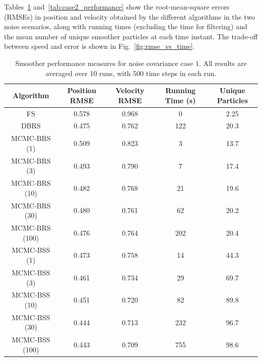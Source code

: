 \documentclass[10pt,twocolumn,twoside]{IEEEtran}
\begin{document}
Tables~\ref{tab:case1_performance} and~\ref{tab:case2_performance} show the root-mean-square errors (RMSEs) in position and velocity obtained by the different algorithms in the two noise scenarios, along with running times (excluding the time for filtering) and the mean number of unique smoother particles at each time instant. The trade-off between speed and error is shown in Fig.~\ref{fig:rmse_vs_time}.

\begin{table}[!t]%
\renewcommand{\arraystretch}{1.3}
\caption{Smoother performance measures for noise covariance case 1. All results are averaged over 10 runs, with 500 time steps in each run.}
\label{tab:case1_performance}
\centering
\begin{tabular}{|c||c|c|c|c|}
\hline
Algorithm & \begin{minipage}[c]{1cm} Position RMSE \end{minipage} & \begin{minipage}[c]{1cm}  Velocity RMSE \end{minipage} & \begin{minipage}[c]{1cm}  Running Time (s) \end{minipage} & \begin{minipage}[c]{1cm}  Unique Particles \end{minipage} \\
\hline
FS 						& 0.578 & 0.968 & 0 & 2.25 \\
DBRS					& 0.475 & 0.762 & 122 & 20.3 \\
\hline
MCMC-BRS (1)    & 0.509 & 0.823 & 3 & 13.7  \\
MCMC-BRS (3)    & 0.493 & 0.790 & 7 & 17.4  \\
MCMC-BRS (10)   & 0.482 & 0.768 & 21 & 19.6 \\
MCMC-BRS (30)   & 0.480 & 0.761 & 62 & 20.2 \\
MCMC-BRS (100)  & 0.476 & 0.764 & 202 & 20.4  \\
\hline
MCMC-BSS (1)	& 0.473 & 0.758 & 14 & 44.3 \\
MCMC-BSS (3)	& 0.461 & 0.734 & 29 & 69.7 \\
MCMC-BSS (10)	& 0.451 & 0.720 & 82 & 89.8 \\
MCMC-BSS (30)	& 0.444 & 0.713 & 232 & 96.7 \\
MCMC-BSS (100)& 0.443 & 0.709 & 755 & 98.6 \\
\hline
\end{tabular}
\end{table}
\end{document}
